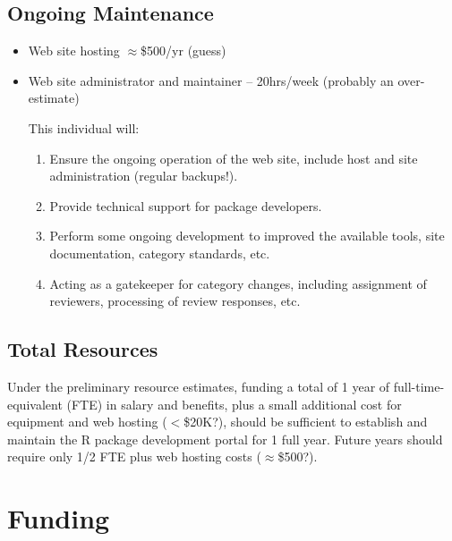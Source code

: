 \documentclass[12pt]{article}
\begin{document}
\subsection{Ongoing Maintenance}

\begin{itemize}

\item Web site hosting $\approx$\$500/yr  (guess)

\item Web site administrator and maintainer -- 20hrs/week (probably an
  over-estimate)

  This individual will:

  \begin{enumerate}

  \item Ensure the ongoing operation of the web site, include host and
    site administration (regular backups!).

  \item Provide technical support for package developers.

  \item Perform some ongoing development to improved the available
    tools, site documentation, category standards, etc.

  \item Acting as a gatekeeper for category changes, including
    assignment of reviewers, processing of review responses, etc.

  \end{enumerate}

\end{itemize}


\subsection{Total Resources}

Under the preliminary resource estimates, funding a total of 1
year of full-time-equivalent (FTE) in salary and benefits, plus a
small additional cost for equipment and web hosting ($<$\$20K?), should
be sufficient to establish and maintain the R package development
portal for 1 full year.  Future years should require only 1/2 FTE
plus web hosting costs ($\approx$\$500?).

\section{Funding}
\end{document}
